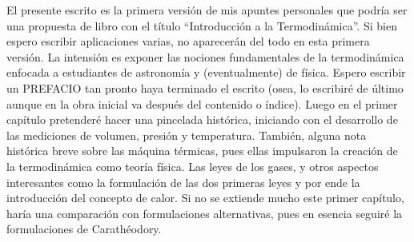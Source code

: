 El presente escrito es la primera versión  de mis apuntes personales que podría ser una propuesta de libro con el título ``Introducción a la Termodinámica''. Si bien espero escribir aplicaciones varias, no aparecerán del todo en esta  primera versión. La intensión es exponer las nociones fundamentales de la termodinámica enfocada a  estudiantes de astronomía y (eventualmente) de física. Espero escribir un PREFACIO tan pronto haya terminado el escrito (osea, lo escribiré de último aunque en la obra inicial va después del contenido o índice). Luego en el primer capítulo pretenderé hacer una pincelada histórica, iniciando con el desarrollo de las mediciones de volumen, presión y temperatura. También, alguna nota histórica breve sobre las máquina térmicas, pues ellas impulsaron la creación de la termodinámica como teoría física. Las leyes de los gases, y otros aspectos interesantes como la formulación de las dos primeras leyes y por ende la introducción del concepto de calor. Si no se extiende mucho este primer capítulo, haría una comparación con formulaciones alternativas, pues en esencia seguiré la formulaciones de Carathéodory.